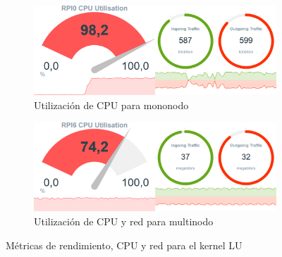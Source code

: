 \begin{figure}[htpb]
    \begin{subfigure}[c]{0.75\textwidth}
        \includegraphics[width=\textwidth]{img/benchmark_rev/lu_rev_sn.png}
        \caption{Utilización de CPU para mononodo}
        \label{fig:mops_rev_sn__lu}
    \end{subfigure}

    \vspace{0.5cm}
    
    \begin{subfigure}[c]{0.75\textwidth}
        \includegraphics[width=\textwidth]{img/benchmark_rev/lu_rev_mn.png}
        \caption{Utilización de CPU y red para multinodo}
        \label{fig:mops_rev_mn__lu}
    \end{subfigure}
    \caption{Métricas de rendimiento, CPU y red para el kernel LU}
    \label{fig:mops__lu}
\end{figure}


